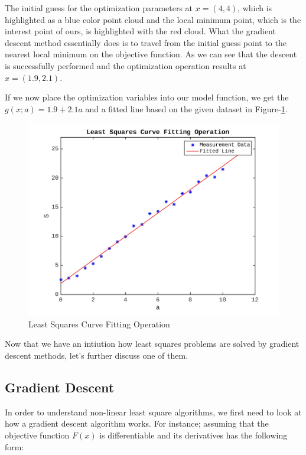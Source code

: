 \documentclass[a4paper]{report}
\numberwithin{figure}{section}
\begin{document}
The initial guess for the optimization parameters at $x=(4,4)$, which
is highlighted as a blue color point cloud and 
the local minimum point, which is the interest point of ours, 
is highlighted with the red cloud. What the gradient descent method essentially 
does is to travel from the initial guess point to the nearest local minimum 
on the objective function. As we can see
that the descent is successfully performed and the optimization
operation results at $x=(1.9,2.1)$. 


If we now place the optimization variables into our model function, we
get the $g(x;a)=1.9+2.1a$ and a fitted line based on the given
dataset in
Figure-\ref{fig:lsq_curve_fit_operation}.

\begin{figure}[H]
	\centering
	\includegraphics[width=\linewidth,natwidth=640,natheight=640]
	{fig/lsq_curve_fit_operation_v2.jpg}
	\caption{Least Squares Curve Fitting Operation}
	\label{fig:lsq_curve_fit_operation}
\end{figure}

Now that we have an intiution how least squares problems are solved 
by gradient descent methods, let's further discuss one of them.

\subsection{Gradient Descent}

In order to understand non-linear least square algorithms, 
we first need to look at how a gradient descent algorithm works. For instance; 
assuming that the objective function $F(x)$ is differentiable and its 
derivatives has the following form:
\end{document}
